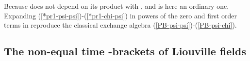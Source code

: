 \documentclass[a4paper,12pt]{article}
\begin{document}
Because \coordHE{} does not depend on \coordHE{} its
product with \coordHE{}, \coordHE{} and \coordHE{} is here an
ordinary one.  Expanding (\ref{*pr1-psi-psi})-(\ref{*pr1-chi-psi}) in
powers of \myHighlight{$\hbar$}\coordHE{} the zero and first order terms in \myHighlight{$\hbar$}\coordHE{} reproduce
 the classical exchange algebra
(\ref{PB-psi-psi})-(\ref{PB-psi-chi}).



\subsection{The non-equal time \myHighlight{$*$}\coordHE{}-brackets of Liouville  fields}
\end{document}

